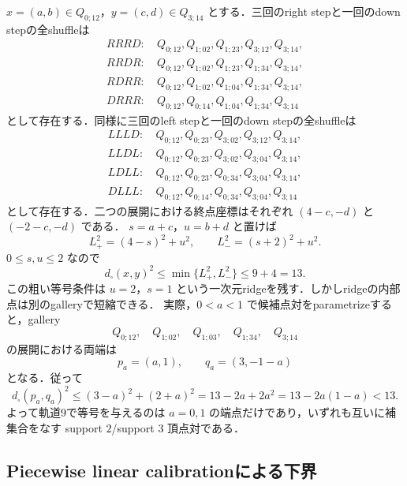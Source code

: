 \documentclass[a4paper,11pt]{ltjsarticle}
\numberwithin{equation}{section}
\theoremstyle{plain}
\theoremstyle{definition}
\theoremstyle{remark}
\begin{document}
$x=(a,b)\in Q_{0;12}$，$y=(c,d)\in Q_{3;14}$ とする．三回のright stepと一回のdown stepの全shuffleは
\begin{align*}
 RRRD:&\ Q_{0;12},Q_{1;02},Q_{1;23},Q_{3;12},Q_{3;14},\\
 RRDR:&\ Q_{0;12},Q_{1;02},Q_{1;23},Q_{1;34},Q_{3;14},\\
 RDRR:&\ Q_{0;12},Q_{1;02},Q_{1;04},Q_{1;34},Q_{3;14},\\
 DRRR:&\ Q_{0;12},Q_{0;14},Q_{1;04},Q_{1;34},Q_{3;14}
\end{align*}
として存在する．同様に三回のleft stepと一回のdown stepの全shuffleは
\begin{align*}
 LLLD:&\ Q_{0;12},Q_{0;23},Q_{3;02},Q_{3;12},Q_{3;14},\\
 LLDL:&\ Q_{0;12},Q_{0;23},Q_{3;02},Q_{3;04},Q_{3;14},\\
 LDLL:&\ Q_{0;12},Q_{0;23},Q_{0;34},Q_{3;04},Q_{3;14},\\
 DLLL:&\ Q_{0;12},Q_{0;14},Q_{0;34},Q_{3;04},Q_{3;14}
\end{align*}
として存在する．二つの展開における終点座標はそれぞれ $(4-c,-d)$ と $(-2-c,-d)$ である．
$s=a+c$，$u=b+d$ と置けば
\begin{equation}\label{eq:orbit9-lengths}
 L_+^2=(4-s)^2+u^2,
 \qquad
 L_-^2=(s+2)^2+u^2.
\end{equation}
$0\le s,u\le2$ なので
\begin{equation}\label{eq:orbit9-bound}
 d_\square(x,y)^2
 \le\min\{L_+^2,L_-^2\}
 \le9+4=13.
\end{equation}
この粗い等号条件は $u=2$，$s=1$ という一次元ridgeを残す．しかしridgeの内部点は別のgalleryで短縮できる．
実際，$0<a<1$ で候補点対をparametrizeすると，gallery
\begin{equation}\label{eq:orbit9-ridge-gallery}
 Q_{0;12},\quad Q_{1;02},\quad Q_{1;03},\quad Q_{1;34},\quad Q_{3;14}
\end{equation}
の展開における両端は
\begin{equation}\label{eq:orbit9-ridge-points}
 p_a=(a,1),
 \qquad q_a=(3,-1-a)
\end{equation}
となる．従って
\begin{equation}\label{eq:orbit9-ridge-sharp}
 d_\square(p_a,q_a)^2
 \le(3-a)^2+(2+a)^2
 =13-2a+2a^2
 =13-2a(1-a)<13.
\end{equation}
よって軌道9で等号を与えるのは $a=0,1$ の端点だけであり，いずれも互いに補集合をなす
support $2$/support $3$ 頂点対である．

\subsection{Piecewise linear calibrationによる下界}
\end{document}
